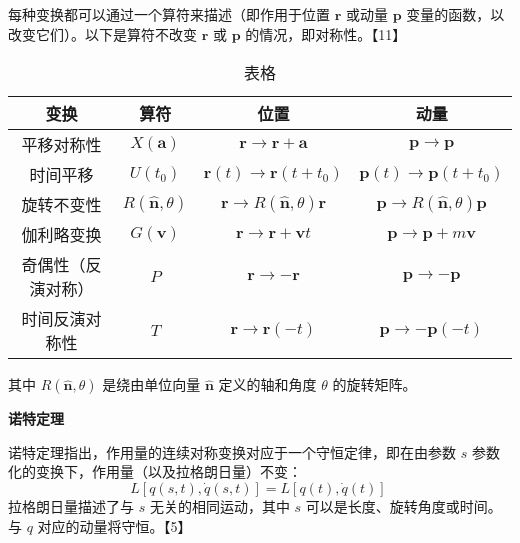 每种变换都可以通过一个算符来描述（即作用于位置 \( \mathbf{r} \) 或动量 \( \mathbf{p} \) 变量的函数，以改变它们）。以下是算符不改变 \( \mathbf{r} \) 或 \( \mathbf{p} \) 的情况，即对称性。【11】
\begin{table}[ht]
\centering
\caption{表格}\label{DCX}
\begin{tabular}{|c|c|c|c|}
\hline
\textbf{变换} & \textbf{算符} & \textbf{位置} & \textbf{动量} \\
\hline
平移对称性 & \( X(\mathbf{a}) \) & \( \mathbf{r} \to \mathbf{r} + \mathbf{a} \) & \( \mathbf{p} \to \mathbf{p} \) \\
\hline
时间平移 & \( U(t_0) \) & \( \mathbf{r}(t) \to \mathbf{r}(t + t_0) \) & \( \mathbf{p}(t) \to \mathbf{p}(t + t_0) \) \\
\hline
旋转不变性 & \( R(\hat{\mathbf{n}}, \theta) \) & \( \mathbf{r} \to R(\hat{\mathbf{n}}, \theta) \mathbf{r} \) & \( \mathbf{p} \to R(\hat{\mathbf{n}}, \theta) \mathbf{p} \) \\
\hline
伽利略变换 & \( G(\mathbf{v}) \) & \( \mathbf{r} \to \mathbf{r} + \mathbf{v}t \) & \( \mathbf{p} \to \mathbf{p} + m \mathbf{v} \) \\
\hline
奇偶性（反演对称） & \( P \) & \( \mathbf{r} \to -\mathbf{r} \) & \( \mathbf{p} \to -\mathbf{p} \) \\
\hline
时间反演对称性 & \( T \) & \( \mathbf{r} \to \mathbf{r}(-t) \) & \( \mathbf{p} \to -\mathbf{p}(-t) \) \\
\hline
\end{tabular}
\end{table}
其中 \( R(\hat{\mathbf{n}}, \theta) \) 是绕由单位向量 \( \hat{\mathbf{n}} \) 定义的轴和角度 \( \theta \) 的旋转矩阵。

\textbf{诺特定理}  

诺特定理指出，作用量的连续对称变换对应于一个守恒定律，即在由参数 \( s \) 参数化的变换下，作用量（以及拉格朗日量）不变：
\[
L[q(s, t), \dot{q}(s, t)] = L[q(t), \dot{q}(t)]~
\]
拉格朗日量描述了与 \( s \) 无关的相同运动，其中 \( s \) 可以是长度、旋转角度或时间。与 \( q \) 对应的动量将守恒。【5】